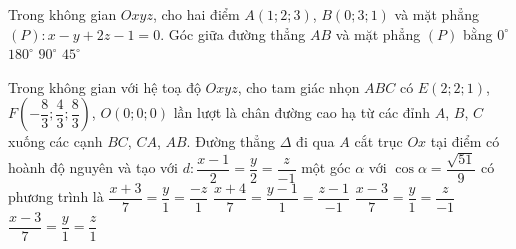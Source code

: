 \begin{ex}%
	Trong không gian $Oxyz$, cho hai điểm $A(1; 2; 3)$, $B(0; 3; 1)$ và mặt phẳng $(P)\colon x-y+2 z-1=0$.  Góc giữa đường thẳng $A B$ và mặt phẳng $(P)$ bằng
	\choice 
		 {$0^{\circ}$}
		 {$180^{\circ}$}
		 {\True $90^{\circ}$}
		{$45^{\circ}$} 
\end{ex}

\begin{ex}%
	Trong không gian với hệ toạ độ $Oxyz$, cho tam giác nhọn $ABC$ có $E(2;2;1)$, $F\left(-\dfrac{8}{3};\dfrac{4}{3};\dfrac{8}{3}\right)$, $O(0;0;0)$  lần lượt là chân đường cao hạ từ các đỉnh $A$, $B$, $C$ xuống các cạnh $BC$, $CA$, $AB$. Đường thẳng $\Delta$ đi qua $A$ cắt trục $Ox$ tại điểm có hoành độ nguyên và tạo với $d \colon\dfrac{x-1}{2}=\dfrac{y}{2}=\dfrac{z}{-1}$ một góc $\alpha$ với $\cos\alpha=\dfrac{\sqrt{51}}{9}$ có phương trình là
	\choice 
		 {$\dfrac{x+3}{7}=\dfrac{y}{1}=\dfrac{-z}{1}$}
		{$\dfrac{x+4}{7}=\dfrac{y-1}{1}=\dfrac{z-1}{-1}$} 
		{\True  $\dfrac{x-3}{7}=\dfrac{y}{1}=\dfrac{z}{-1}$}
		 {$\dfrac{x-3}{7}=\dfrac{y}{1}=\dfrac{z}{1}$}
\end{ex}
